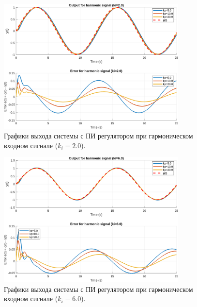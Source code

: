 \begin{figure}[H]
    \centering
    \includegraphics[width=0.85\textwidth]{figs/task_5_out_harmonic_ki2.0.png}
    \caption{Графики выхода системы с ПИ регулятором при гармоническом входном сигнале (\( k_i = 2.0 \)).}
    \label{fig:task_5_out_harmonic_ki2.0}
\end{figure}

\begin{figure}[H]
    \centering
    \includegraphics[width=0.85\textwidth]{figs/task_5_out_harmonic_ki6.0.png}
    \caption{Графики выхода системы с ПИ регулятором при гармоническом входном сигнале (\( k_i = 6.0 \)).}
    \label{fig:task_5_out_harmonic_ki6.0}
\end{figure}

